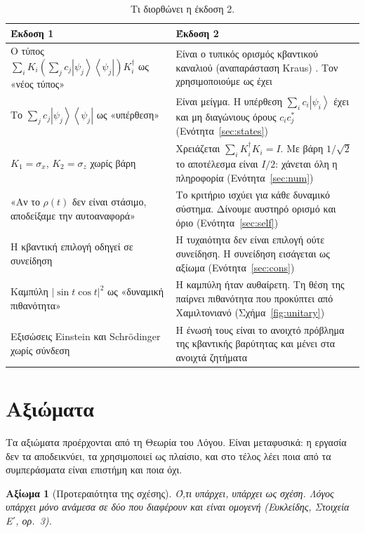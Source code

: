 \documentclass[a4paper,11pt]{article}
\newtheorem{axiom}{Αξίωμα}
\theoremstyle{definition}
\newcommand{\ket}[1]{\left|#1\right\rangle}
\newcommand{\bra}[1]{\left\langle#1\right|}
\begin{document}
\begin{table}[h]
\centering
\small
\begin{tabular}{>{\raggedright}p{} >{\raggedright\arraybackslash}p{}}
\toprule
\textbf{Έκδοση 1} & \textbf{Έκδοση 2} \\
\midrule
Ο τύπος $\sum_i K_i(\sum_j c_j\ket{\psi_j}\bra{\psi_j})K_i^\dagger$ ως «νέος τύπος» & Είναι ο τυπικός ορισμός κβαντικού καναλιού (αναπαράσταση Kraus) \cite{kraus,nielsen}. Τον χρησιμοποιούμε ως έχει \\
Το $\sum_j c_j\ket{\psi_j}\bra{\psi_j}$ ως «υπέρθεση» & Είναι μείγμα. Η υπέρθεση $\sum_i c_i\ket{\psi_i}$ έχει και μη διαγώνιους όρους $c_ic_j^*$ (Ενότητα~\ref{sec:states}) \\
$K_1=\sigma_x$, $K_2=\sigma_z$ χωρίς βάρη & Χρειάζεται $\sum_i K_i^\dagger K_i=I$. Με βάρη $1/\sqrt2$ το αποτέλεσμα είναι $I/2$: χάνεται όλη η πληροφορία (Ενότητα~\ref{sec:num}) \\
«Αν το $\rho(t)$ δεν είναι στάσιμο, αποδείξαμε την αυτοαναφορά» & Το κριτήριο ισχύει για κάθε δυναμικό σύστημα. Δίνουμε αυστηρό ορισμό και όριο (Ενότητα~\ref{sec:self}) \\
Η κβαντική επιλογή οδηγεί σε συνείδηση & Η τυχαιότητα δεν είναι επιλογή ούτε συνείδηση. Η συνείδηση εισάγεται ως αξίωμα (Ενότητα~\ref{sec:cons}) \\
Καμπύλη $|\sin t\cos t|^2$ ως «δυναμική πιθανότητα» & Η καμπύλη ήταν αυθαίρετη. Τη θέση της παίρνει πιθανότητα που προκύπτει από Χαμιλτονιανό (Σχήμα~\ref{fig:unitary}) \\
Εξισώσεις Einstein και Schrödinger χωρίς σύνδεση & Η ένωσή τους είναι το ανοιχτό πρόβλημα της κβαντικής βαρύτητας και μένει στα ανοιχτά ζητήματα \\
\bottomrule
\end{tabular}
\caption{Τι διορθώνει η έκδοση 2.}
\label{tab:fixes}
\end{table}

\section{Αξιώματα}

Τα αξιώματα προέρχονται από τη Θεωρία του Λόγου. Είναι μεταφυσικά: η εργασία δεν τα αποδεικνύει, τα χρησιμοποιεί ως πλαίσιο, και στο τέλος λέει ποια από τα συμπεράσματα είναι επιστήμη και ποια όχι.

\begin{axiom}[Προτεραιότητα της σχέσης]
Ό,τι υπάρχει, υπάρχει ως σχέση. Λόγος υπάρχει μόνο ανάμεσα σε δύο που διαφέρουν και είναι ομογενή (Ευκλείδης, Στοιχεία Ε΄, ορ.~3).
\end{axiom}
\end{document}
